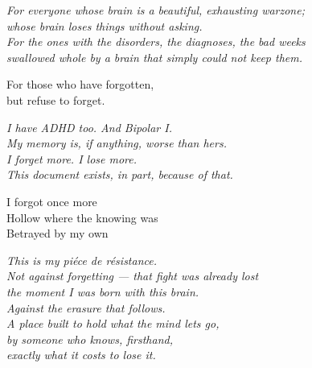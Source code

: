 \documentclass[11pt,a4paper]{book}
\begin{document}
\thispagestyle{empty}
\vspace*{\fill}
\begin{center}

  {\itshape
    For everyone whose brain is a beautiful, exhausting warzone;\\
    whose brain loses things without asking.\\
    For the ones with the disorders, the diagnoses, the bad weeks\\
    swallowed whole by a brain that simply could not keep them.\\[2em]
  }

  {\upshape
    For those who have forgotten,\\
    but refuse to forget.\\
  }

\end{center}
\vspace*{\fill}
\clearpage
\cleardoublepage

\thispagestyle{empty}
\vspace*{\fill}
\begin{center}

  {\itshape
    I have ADHD too. And Bipolar I.\\
    My memory is, if anything, worse than hers.\\
    I forget more. I lose more.\\
    This document exists, in part, because of that.\\[2em]
  }

  {\upshape
    I forgot once more\\
    Hollow where the knowing was\\
    Betrayed by my own\\[2em]
  }

  {\itshape
    This is my pi\'ece de r\'esistance.\\
    Not against forgetting --- that fight was already lost\\
    the moment I was born with this brain.\\
    Against the erasure that follows.\\
    A place built to hold what the mind lets go,\\
    by someone who knows, firsthand,\\
    exactly what it costs to lose it.\\
  }

\end{center}
\vspace*{\fill}
\clearpage
\cleardoublepage
\end{document}
